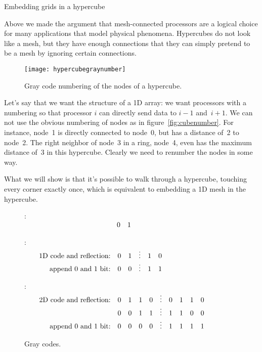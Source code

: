  {Embedding grids in a hypercube}

\def\graycodepicture{
\begin{wrapfigure}{r}{3in}
  \texttt{[image: hypercubegraynumber]}
  \caption{Gray code numbering of the nodes of a hypercube.}
  \label{fig:cubegraynumber}
\end{wrapfigure}
}

Above we made the argument that mesh-connected processors are a
logical choice for many applications that model physical phenomena.
Hypercubes do not look like a mesh, but they have enough
connections that they can simply pretend to be a mesh by ignoring
certain connections. 

\begin{lulu}
\newpage
\graycodepicture  
\end{lulu}
%
Let's say that we want the structure of a 1D array: we want processors
with a numbering so that processor $i$ can directly send data to $i-1$
and~$i+1$. We can not use the obvious numbering of
nodes as in figure~\ref{fig:cubenumber}. For instance, node~1 is
directly connected to node~0, but has a distance of~2 to node~2. The
right neighbor of node~3 in a ring, node~4, even has the maximum
distance of~3 in this hypercube. Clearly we need to renumber the nodes
in some way.

What we will show is that
it's possible to walk through a hypercube, touching
every corner exactly once, which is equivalent to embedding a 1D mesh
in the hypercube.

\begin{figure}[ht]
\hbox{:
$\vcenter{$
\begin{array}{rll}
  \hphantom{1D code and reflection:}&0&1\\
\end{array}$}
$}

\hbox{:
$\vcenter{$
\begin{array}{rccccc}
  \hbox{1D code and reflection:}&0&1&\vdots&1&0\\
  \hbox{append 0 and 1 bit:}&0&0&\vdots&1&1
\end{array}$}
$}

\hbox{:
$\vcenter{$
\begin{array}{rccccccccc}
  \hbox{2D code and reflection:}&0&1&1&0&\vdots&0&1&1&0\\
  &0&0&1&1&\vdots&1&1&0&0\\
  \hbox{append 0 and 1 bit:}&0&0&0&0&\vdots&1&1&1&1
\end{array}$}
$}

  \caption{Gray codes.}
  \label{fig:graycode}
\end{figure}

